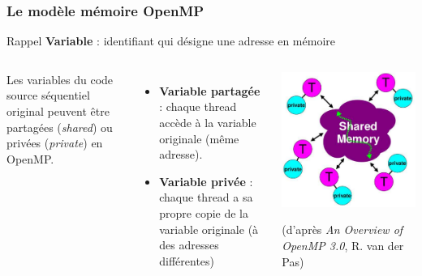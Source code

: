 \documentclass{beamer}
\begin{document}
\begin{frame}
  \frametitle{Le modèle mémoire OpenMP}

  \begin{block}{Rappel}
    \textbf{Variable} : \alert{identifiant} qui désigne une \alert{adresse en mémoire}
  \end{block}
  
  \begin{columns}[t]

    Les variables du code source séquentiel original peuvent \^etre
    partagées ({\it shared}) ou privées ({\it private}) en OpenMP. 

    \medskip
    
    \begin{itemize}
    \item {\bf Variable partagée} : chaque thread accède à la variable originale (même adresse). 

    \item {\bf Variable privée} : chaque thread a sa propre \alert{copie} %
      de la variable originale (à des adresses différentes)
    \end{itemize}
    
    \begin{center}
      \includegraphics[width=\textwidth]{modele_mem_OpenMP}    

      {\tiny (d'après {\it An Overview of OpenMP 3.0}, R. van der Pas)} 
    \end{center}
  \end{columns}


\end{frame}
\end{document}
